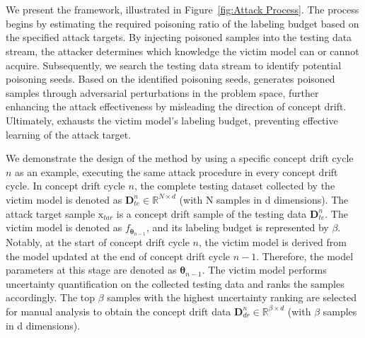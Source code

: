 \section{\pandora}
\label{Sec: Attack Method}

We present the \pandora framework, illustrated in Figure~\ref{fig:Attack Process}.
The process begins by estimating the required poisoning ratio of the labeling budget based on the specified attack targets.
By injecting poisoned samples into the testing data stream, the attacker determines which knowledge the victim model can or cannot acquire.
Subsequently, we search the testing data stream to identify potential poisoning seeds.
Based on the identified poisoning seeds, \pandora generates poisoned samples through adversarial perturbations in the problem space, further enhancing the attack effectiveness by misleading the direction of concept drift.
Ultimately, \pandora exhausts the victim model’s labeling budget, preventing effective learning of the attack target.


We demonstrate the design of the \pandora method by using a specific concept drift cycle $n$ as an example, executing the same attack procedure in every concept drift cycle.
In concept drift cycle $n$, the complete testing dataset collected by the victim model is denoted as $\bm{D}_{te}^{n} \in \mathbb{R}^{N \times d}$ (with N samples in d dimensions).
The attack target sample $\bm{\mathrm{x}}_{tar}$ is a concept drift sample of the testing data $\bm{D}_{te}^{n}$. 
The victim model is denoted as $f_{\bm{\theta}_{n-1}}$, and its labeling budget is represented by $\beta$.
Notably, at the start of concept drift cycle $n$, the victim model is derived from the model updated at the end of concept drift cycle $n-1$. Therefore, the model parameters at this stage are denoted as $\bm{\theta}_{n-1}$.
The victim model performs uncertainty quantification on the collected testing data and ranks the samples accordingly.
The top $\beta$ samples with the highest uncertainty ranking are selected for manual analysis to obtain the concept drift data $\bm{D}_{dr}^{n} \in \mathbb{R}^{\beta \times d}$ (with $\beta$ samples in d dimensions).

